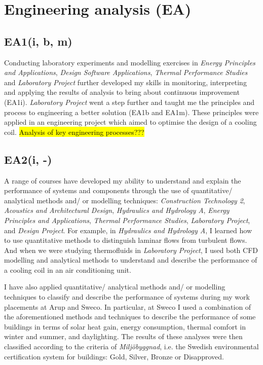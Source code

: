 \section{Engineering analysis (EA)} \label{EA}

\subsection*{EA1(i, b, m)}

Conducting laboratory experiments and modelling exercises in \textit{Energy Principles and Applications}, \textit{Design Software Applications}, \textit{Thermal Performance Studies} and \textit{Laboratory Project} further developed my skills in monitoring, interpreting and applying the results of analysis to bring about continuous improvement (EA1i).
\textit{Laboratory Project} went a step further and taught me the principles and process to engineering a better solution (EA1b and EA1m).
These principles were applied in an engineering project which aimed to optimise the design of a cooling coil.
\hl{Analysis of key engineering processes???}


\subsection*{EA2(i, -)}

A range of courses have developed my ability to understand and explain the performance of systems and components through the use of quantitative/ analytical methods and/ or modelling techniques:
\textit{Construction Technology 2},
\textit{Acoustics and Architectural Design},
\textit{Hydraulics and Hydrology A},
\textit{Energy Principles and Applications},
\textit{Thermal Performance Studies},
\textit{Laboratory Project},
and \textit{Design Project}.
For example, in \textit{Hydraulics and Hydrology A}, I learned how to use quantitative methods to distinguish laminar flows from turbulent flows.
And when we were studying thermofluids in \textit{Laboratory Project}, I used both CFD modelling and analytical methods to understand and describe the performance of a cooling coil in an air conditioning unit.

I have also applied quantitative/ analytical methods and/ or modelling techniques to classify and describe the performance of systems during my work placements at Arup and Sweco.
In particular, at Sweco I used a combination of the aforementioned methods and techniques to describe the performance of some buildings in terms of solar heat gain, energy consumption, thermal comfort in winter and summer, and daylighting.
The results of these analyses were then classified according to the criteria of \textit{Miljöbyggnad}, i.e. the Swedish environmental certification system for buildings: Gold, Silver, Bronze or Disapproved.


